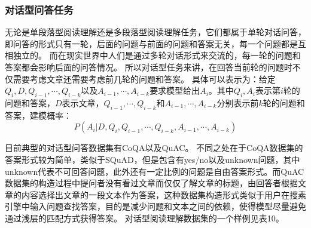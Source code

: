 \subsubsection{对话型问答任务}\label{cmrc}
%
%
无论是单段落型阅读理解还是多段落型阅读理解任务，它们都属于单轮对话问答，即问答的形式只有一轮，后面的问题与前面的问题和答案无关，每一个问题都是互相独立的。
而在现实世界中人们是通过多轮对话形式来交流的，每一轮的问题和答案都会影响后面的问答情况。
所以对话型任务来讲，在回答当前轮的问题时不仅需要考虑文章还需要考虑前几轮的问题和答案。
具体可以表示为：给定$Q_i,D,Q_{i-1},\cdots,Q_{i-k}$以及$A_{i-1},\cdots,A_{i-k}$要求模型给出$A_{i}$。其中$Q_i,A_i$表示第$i$轮的问题和答案，$D$表示文章，$Q_{i-1},\cdots,Q_{i-k}$和$A_{i-1},\cdots,A_{i-k}$分别表示前$k$轮的问题和答案，建模概率：
\begin{equation}
P(A_i|D,Q_i,Q_{i-1},\cdots,Q_{i-k},A_{i-1},\cdots,A_{i-k})
\end{equation}

目前典型的对话型问答数据集有CoQA以及QuAC。
不同之处在于CoQA数据集的答案形式较为简单，类似于SQuAD，但是包含有yes/no以及unknown问题，其中unknown代表不可回答问题，此外还有一定比例的问题是自由答案形式。而QuAC数据集的构造过程中提问者没有看过文章而仅仅了解文章的标题，由回答者根据文章的内容选择出文章的一段文本作为答案，这种数据集构造形式类似于用户在搜素引擎中输入问题查找答案，目的是减少问题和文本之间的依赖，使得模型尽量避免通过浅层的匹配方式获得答案。
对话型阅读理解数据集的一个样例见表10。

